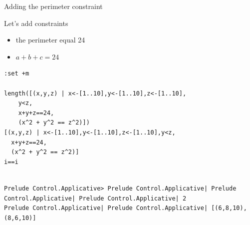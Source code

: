 \documentclass[presetation]{beamer}
\begin{document}
\begin{frame}[fragile,label={sec:org4393f83}]{Adding the perimeter constraint}
 \begin{block}{Let's add constraints}
\begin{itemize}
\item the perimeter equal 24
\item \(a + b + c = 24\)
\end{itemize}

\begin{verbatim}
:set +m

length([(x,y,z) | x<-[1..10],y<-[1..10],z<-[1..10],
	y<z,
	x+y+z==24,
	(x^2 + y^2 == z^2)])
[(x,y,z) | x<-[1..10],y<-[1..10],z<-[1..10],y<z,
  x+y+z==24,
  (x^2 + y^2 == z^2)]
i==i
\end{verbatim}

\begin{verbatim}

Prelude Control.Applicative> Prelude Control.Applicative| Prelude Control.Applicative| Prelude Control.Applicative| 2
Prelude Control.Applicative| Prelude Control.Applicative| [(6,8,10),(8,6,10)]
\end{verbatim}
\end{block}
\end{frame}
\end{document}
